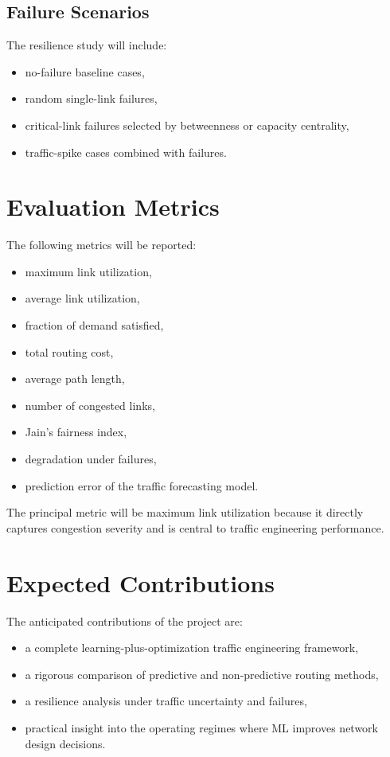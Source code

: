 \documentclass[11pt]{article}
\begin{document}
\subsection{Failure Scenarios}
The resilience study will include:
\begin{itemize}
    \item no-failure baseline cases,
    \item random single-link failures,
    \item critical-link failures selected by betweenness or capacity centrality,
    \item traffic-spike cases combined with failures.
\end{itemize}

\section{Evaluation Metrics}
The following metrics will be reported:
\begin{itemize}
    \item maximum link utilization,
    \item average link utilization,
    \item fraction of demand satisfied,
    \item total routing cost,
    \item average path length,
    \item number of congested links,
    \item Jain's fairness index,
    \item degradation under failures,
    \item prediction error of the traffic forecasting model.
\end{itemize}

The principal metric will be maximum link utilization because it directly captures congestion severity and is central to traffic engineering performance.

\section{Expected Contributions}
The anticipated contributions of the project are:
\begin{itemize}
    \item a complete learning-plus-optimization traffic engineering framework,
    \item a rigorous comparison of predictive and non-predictive routing methods,
    \item a resilience analysis under traffic uncertainty and failures,
    \item practical insight into the operating regimes where ML improves network design decisions.
\end{itemize}
\end{document}
